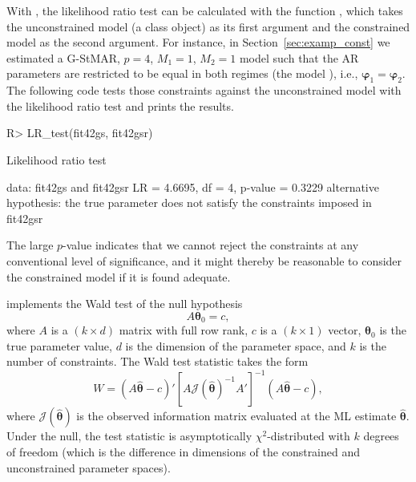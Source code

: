 \documentclass[nojss]{jss} %
\begin{document}
With , the likelihood ratio test can be calculated with the function , which takes the unconstrained model (a class  object) as its first argument and the constrained model as the second argument. For instance, in Section~\ref{sec:examp_const} we estimated a G-StMAR, $p=4$, $M_1=1$, $M_2=1$ model such that the AR parameters are restricted to be equal in both regimes (the model ), i.e., $\boldsymbol{\varphi}_1=\boldsymbol{\varphi}_2$. The following code tests those constraints against the unconstrained model  with the likelihood ratio test and prints the results.
%
\begin{CodeChunk}
\begin{CodeInput}
R> LR_test(fit42gs, fit42gsr)
\end{CodeInput}
\begin{CodeOutput}
	Likelihood ratio test

data:  fit42gs and fit42gsr
LR = 4.6695, df = 4, p-value = 0.3229
alternative hypothesis: the true parameter does not satisfy the constraints
imposed in fit42gsr
\end{CodeOutput}
\end{CodeChunk}
%
The large $p$-value indicates that we cannot reject the constraints at any conventional level of significance, and it might thereby be reasonable to consider the constrained model if it is found adequate.

 implements the Wald test of the null hypothesis
\begin{equation}
A\boldsymbol{\theta}_0 = c,
\end{equation}
where $A$ is a $(k \times d)$ matrix with full row rank, $c$ is a $(k \times 1)$ vector, $\boldsymbol{\theta}_0$ is the true parameter value, $d$ is the dimension of the parameter space, and $k$ is the number of constraints. The Wald test statistic takes the form
\begin{equation}
W = (A\hat{\boldsymbol{\theta}} - c)'[A\mathcal{J}(\hat{\boldsymbol{\theta}})^{-1}A']^{-1}(A\hat{\boldsymbol{\theta}} - c),
\end{equation}
where $\mathcal{J}(\hat{\boldsymbol{\theta}})$ is the observed information matrix evaluated at the ML estimate $\hat{\boldsymbol{\theta}}$. Under the null, the test statistic is asymptotically $\chi^2$-distributed with $k$ degrees of freedom (which is the difference in dimensions of the constrained and unconstrained parameter spaces).
\end{document}
